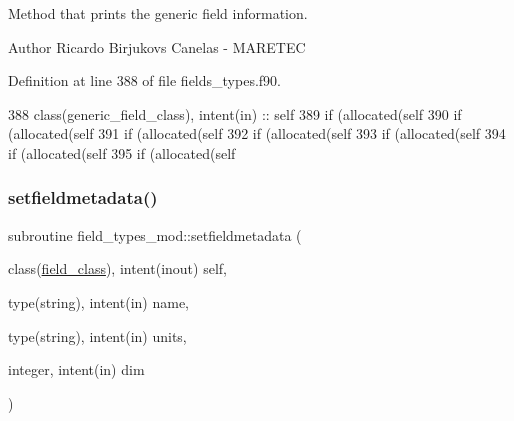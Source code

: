 Method that prints the generic field information. 

\begin{DoxyAuthor}{Author}
Ricardo Birjukovs Canelas -\/ M\+A\+R\+E\+T\+EC 
\end{DoxyAuthor}


Definition at line 388 of file fields\+\_\+types.\+f90.


\begin{DoxyCode}
388     \textcolor{keywordtype}{class}(generic\_field\_class), \textcolor{keywordtype}{intent(in)} :: self
389     \textcolor{keywordflow}{if} (\textcolor{keyword}{allocated}(self%
390     \textcolor{keywordflow}{if} (\textcolor{keyword}{allocated}(self%
391     \textcolor{keywordflow}{if} (\textcolor{keyword}{allocated}(self%
392     \textcolor{keywordflow}{if} (\textcolor{keyword}{allocated}(self%
393     \textcolor{keywordflow}{if} (\textcolor{keyword}{allocated}(self%
394     \textcolor{keywordflow}{if} (\textcolor{keyword}{allocated}(self%
395     \textcolor{keywordflow}{if} (\textcolor{keyword}{allocated}(self%
\end{DoxyCode}
\mbox{\label{namespacefield__types__mod_af6090a0e4ff4834c37af5f33d35fa03d}} 
\subsubsection{\texorpdfstring{setfieldmetadata()}{setfieldmetadata()}}
{\footnotesize\ttfamily subroutine field\+\_\+types\+\_\+mod\+::setfieldmetadata (\begin{DoxyParamCaption}\item[{class(\mbox{\hyperlink{structfield__types__mod_1_1field__class}{field\+\_\+class}}), intent(inout)}]{self,  }\item[{type(string), intent(in)}]{name,  }\item[{type(string), intent(in)}]{units,  }\item[{integer, intent(in)}]{dim }\end{DoxyParamCaption})\hspace{0.3cm}{\ttfamily [private]}}



